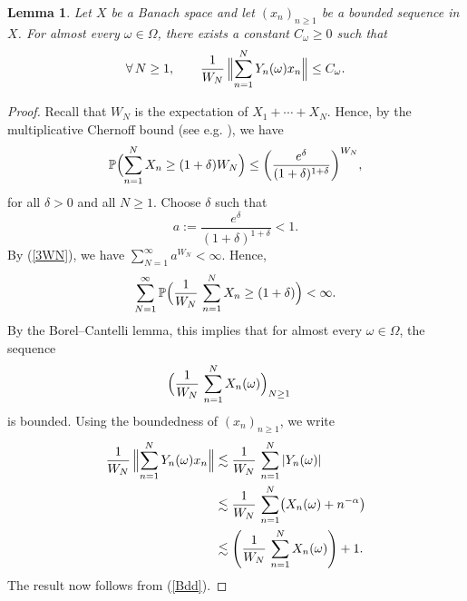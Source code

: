 \documentclass[12pt]{amsart}
\newcommand{\Pdb}{\mbox{$\mathbb{P}$}}
\newcommand{\Bignorm}[1]{\Bigl\Vert#1\Bigr\Vert}
\newtheorem{lemma}[theorem]{Lemma}
\theoremstyle{remark}
\theoremstyle{definition}
\numberwithin{equation}{section}
\begin{document}
\begin{lemma}\label{5L1}
Let $X$ be a Banach space and let $(x_n)_{n\geq 1}$ be a bounded sequence in $X$. 
For almost every $\omega\in \Omega$, there exists a constant
$C_\omega\geq 0$ such that 
$$
\forall\, N\geq 1,\qquad \frac{1}{W_N}\,\Bignorm{\sum_{n=1}^N Y_n(\omega) x_n}\leq C_\omega.
$$
\end{lemma}

\begin{proof}
Recall that $W_N$ is the expectation 
of $X_1+\cdots+X_N$. Hence, by the 
multiplicative Chernoff bound (see e.g. \cite[Theorem 4.1]{MR}), 
we have
$$
\Pdb\Bigl(\sum_{n=1}^N X_n\geq (1+\delta)
W_N\Bigr)\leq\biggl(\frac{e^\delta}{(1+\delta)^{1+\delta}}\biggr)^{W_N},
$$
for all $\delta>0$ and all $N\geq 1$.
Choose $\delta$ such that 
$$
a := \frac{e^\delta}{(1+\delta)^{1+\delta}} < 1.
$$
By (\ref{3WN}), we have $\sum_{N=1}^\infty a^{W_N}<\infty$. Hence,
$$
\sum_{N=1}^\infty \Pdb \Bigl(\frac{1}{W_N}\,\sum_{n=1}^N X_n\geq (1+\delta)\Bigr)<\infty.
$$
By the Borel--Cantelli lemma, 
this implies that for almost every $\omega\in\Omega$, the sequence
\begin{equation}\label{Bdd}
\Bigl(\frac{1}{W_N}\,\sum_{n=1}^N X_n(\omega)\Bigr)_{N\geq 1}
\quad\hbox{}
\end{equation}
is bounded. Using the boundedness of $(x_n)_{n\geq 1}$, we write
\begin{align*}
\frac{1}{W_N}\,\Bignorm{\sum_{n=1}^N Y_n(\omega) x_n}
& \lesssim \frac{1}{W_N}\,\sum_{n=1}^N \vert Y_n(\omega)\vert\\
& \lesssim \frac{1}{W_N}\,\sum_{n=1}^N \bigl(X_n(\omega) + n^{-\alpha}\bigr) \\
& \lesssim \Biggl(\frac{1}{W_N}\,\sum_{n=1}^N X_n(\omega)\Biggr) + 1.
\end{align*}
The result now follows from (\ref{Bdd}).
\end{proof}
\end{document}
